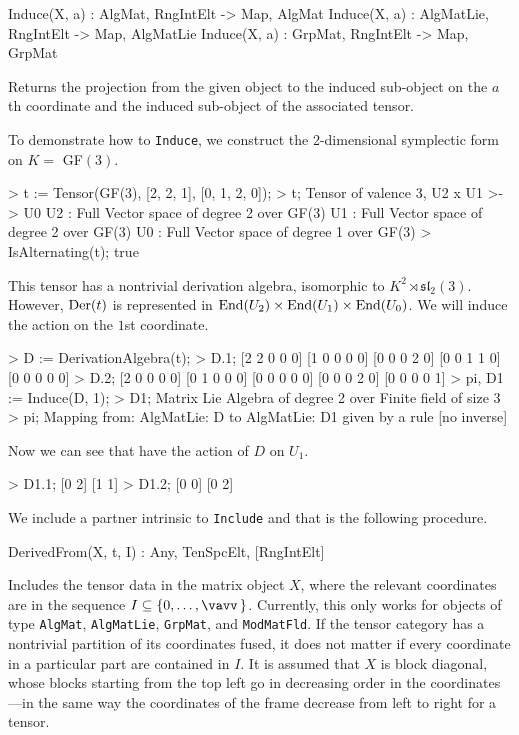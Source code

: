 \begin{intrinsics}
Induce(X, a) : AlgMat, RngIntElt -> Map, AlgMat
Induce(X, a) : AlgMatLie, RngIntElt -> Map, AlgMatLie
Induce(X, a) : GrpMat, RngIntElt -> Map, GrpMat
\end{intrinsics}

Returns the projection from the given object to the induced sub-object on the $a$th coordinate and the induced sub-object of the associated tensor.

\begin{example}[Inducing]

To demonstrate how to \texttt{Induce}, we construct the 2-dimensional symplectic form on $K =$ GF$(3)$. 
\begin{code}
> t := Tensor(GF(3), [2, 2, 1], [0, 1, 2, 0]);
> t;
Tensor of valence 3, U2 x U1 >-> U0
U2 : Full Vector space of degree 2 over GF(3)
U1 : Full Vector space of degree 2 over GF(3)
U0 : Full Vector space of degree 1 over GF(3)
> IsAlternating(t);
true
\end{code}

This tensor has a nontrivial derivation algebra, isomorphic to $K^2\rtimes \mathfrak{sl}_2(3)$. 
However, $\operatorname{Der}(t)$ is represented in $\operatorname{End}(U_2)\times\operatorname{End}(U_1)\times \operatorname{End}(U_0)$. 
We will induce the action on the $1$st coordinate.
\begin{code}
> D := DerivationAlgebra(t);
> D.1;
[2 2 0 0 0]
[1 0 0 0 0]
[0 0 0 2 0]
[0 0 1 1 0]
[0 0 0 0 0]
> D.2;
[2 0 0 0 0]
[0 1 0 0 0]
[0 0 0 0 0]
[0 0 0 2 0]
[0 0 0 0 1]
> pi, D1 := Induce(D, 1);
> D1;
Matrix Lie Algebra of degree 2 over Finite field of size 3
> pi;
Mapping from: AlgMatLie: D to AlgMatLie: D1 given by a rule [no inverse]
\end{code}

Now we can see that have the action of $D$ on $U_1$.
\begin{code}
> D1.1;
[0 2]
[1 1]
> D1.2;
[0 0]
[0 2]
\end{code}
\end{example}

We include a partner intrinsic to \texttt{Include} and that is the following procedure.

\begin{intrinsics}
DerivedFrom(X, t, I) : Any, TenSpcElt, [RngIntElt]
\end{intrinsics}

Includes the tensor data in the matrix object $X$, where the relevant coordinates are in the sequence $I\subseteq \{0,\dots,\vav\}$.
Currently, this only works for objects of type \texttt{AlgMat}, \texttt{AlgMatLie}, \texttt{GrpMat}, and \texttt{ModMatFld}.
If the tensor category has a nontrivial partition of its coordinates fused, it does not matter if every coordinate in a particular part are contained in $I$. 
It is assumed that $X$ is block diagonal, whose blocks starting from the top left go in decreasing order in the coordinates---in the same way the coordinates of the frame decrease from left to right for a tensor. 

